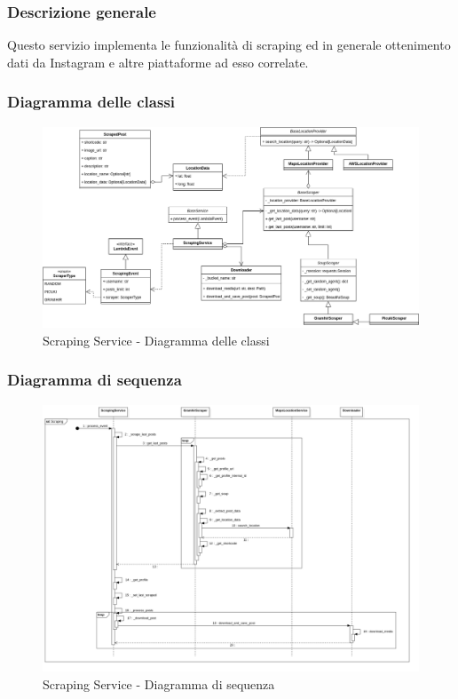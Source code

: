 \subsubsection{Descrizione generale}
Questo servizio implementa le funzionalità di scraping ed in generale ottenimento dati da Instagram e altre piattaforme ad esso correlate.

\subsubsection{Diagramma delle classi}
\begin{figure}[H]
    \includegraphics[width=15cm]{sezioni/images/cd_scraping.png}
    \centering
    \caption{Scraping Service - Diagramma delle classi}
\end{figure}

\subsubsection{Diagramma di sequenza}
\begin{figure}[H]
    \includegraphics[width=15cm]{sezioni/images/sd_scraping.png}
    \centering
    \caption{Scraping Service - Diagramma di sequenza}
\end{figure}


